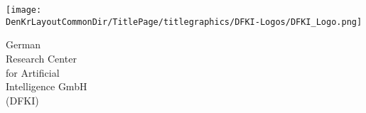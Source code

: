 %
%
%
\begin{minipage}{0.4\textwidth}%
\begin{flushleft}%
\texttt{[image: \\DenKrLayoutCommonDir/TitlePage/titlegraphics/DFKI-Logos/DFKI\_Logo.png]}%
\textsc{\Large }%
\end{flushleft}%
\end{minipage}%
\hfill%
\begin{minipage}{0.5\textwidth}%
\begin{flushright}%
{\Large\sffamily German}\\%
{\Large\sffamily Research Center}\\%
{\Large\sffamily for Artificial}\\%
{\Large\sffamily Intelligence GmbH}\\%
{\Large\sffamily (DFKI)}%
\end{flushright}%
\end{minipage}%
%
\vspace*{0.05\textheight}%
%

%

%
%
